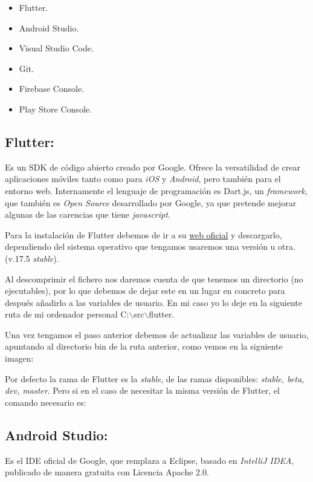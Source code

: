 \begin{itemize}
	\tightlist
	\item Flutter.
	\item Android Studio.
	\item Visual Studio Code.
	\item Git.
	\item Firebase Console.
	\item Play Store Console.
\end{itemize}

\subsection{Flutter:}
Es un SDK de código abierto creado por Google. Ofrece la versatilidad de crear aplicaciones móviles tanto como para \emph{iOS} y \emph{Android}, pero también para el entorno web. Internamente el lenguaje de programación es Dart.js, un \emph{framework}, que también es \emph{Open Source} desarrollado por Google, ya que pretende mejorar algunas de las carencias que tiene \emph{javascript}.

Para la instalación de Flutter debemos de ir a su \href{https://flutter.dev/docs/get-started/install}{web oficial} y descargarlo, dependiendo del sistema operativo que tengamos usaremos una versión u otra. (v.17.5 \emph{stable}).

Al descomprimir el fichero nos daremos cuenta de que tenemos un directorio (no ejecutables), por lo que debemos de dejar este en un lugar en concreto para después añadirlo a las variables de usuario. En mi caso yo lo deje en la siguiente ruta de mi ordenador personal C:$\backslash$src$\backslash$flutter.

Una vez tengamos el paso anterior debemos de actualizar las variables de usuario, apuntando al directorio bin de la ruta anterior, como vemos en la siguiente imagen:


Por defecto la rama de Flutter es la \emph{stable}, de las ramas disponibles: \emph{stable, beta, dev, master}. Pero si en el caso de necesitar la misma versión de Flutter, el comando necesario es:



\subsection{Android Studio:}
Es el IDE oficial de Google, que remplaza a Eclipse, basado en \emph{IntelliJ IDEA}, publicado de manera gratuita con Licencia Apache 2.0.

